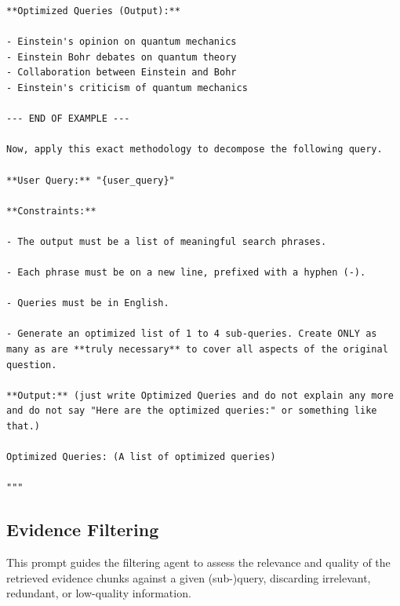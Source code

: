 \documentclass[11pt]{article}
\begin{document}
\begin{lstlisting}[basicstyle=\scriptsize\ttfamily]
**Optimized Queries (Output):**

- Einstein's opinion on quantum mechanics
- Einstein Bohr debates on quantum theory
- Collaboration between Einstein and Bohr
- Einstein's criticism of quantum mechanics

--- END OF EXAMPLE ---

Now, apply this exact methodology to decompose the following query.

**User Query:** "{user_query}"

**Constraints:**

- The output must be a list of meaningful search phrases.

- Each phrase must be on a new line, prefixed with a hyphen (-).

- Queries must be in English.

- Generate an optimized list of 1 to 4 sub-queries. Create ONLY as many as are **truly necessary** to cover all aspects of the original question.

**Output:** (just write Optimized Queries and do not explain any more and do not say "Here are the optimized queries:" or something like that.)

Optimized Queries: (A list of optimized queries)

"""
\end{lstlisting}

\subsection{Evidence Filtering}

This prompt guides the filtering agent to assess the relevance and quality of the retrieved evidence chunks against a given (sub-)query, discarding irrelevant, redundant, or low-quality information.
\end{document}
